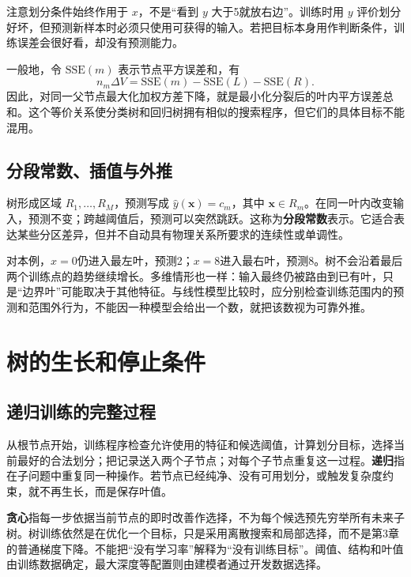 注意划分条件始终作用于 $x$，不是“看到 $y$ 大于5就放右边”。训练时用 $y$ 评价划分好坏，但预测新样本时必须只使用可获得的输入。若把目标本身用作判断条件，训练误差会很好看，却没有预测能力。

一般地，令 $\mathrm{SSE}(m)$ 表示节点平方误差和，有
\[
n_m\Delta V=\mathrm{SSE}(m)-\mathrm{SSE}(L)-\mathrm{SSE}(R).
\]
因此，对同一父节点最大化加权方差下降，就是最小化分裂后的叶内平方误差总和。这个等价关系使分类树和回归树拥有相似的搜索程序，但它们的具体目标不能混用。

\subsection{分段常数、插值与外推}
树形成区域 $R_1,\ldots,R_M$，预测写成 $\hat y(\mathbf x)=c_m$，其中 $\mathbf x\in R_m$。在同一叶内改变输入，预测不变；跨越阈值后，预测可以突然跳跃。这称为\textbf{分段常数}表示。它适合表达某些分区差异，但并不自动具有物理关系所要求的连续性或单调性。


对本例，$x=0$仍进入最左叶，预测2；$x=8$进入最右叶，预测8。树不会沿着最后两个训练点的趋势继续增长。多维情形也一样：输入最终仍被路由到已有叶，只是“边界叶”可能取决于其他特征。与线性模型比较时，应分别检查训练范围内的预测和范围外行为，不能因一种模型会给出一个数，就把该数视为可靠外推。

\section{树的生长和停止条件}
\subsection{递归训练的完整过程}
从根节点开始，训练程序检查允许使用的特征和候选阈值，计算划分目标，选择当前最好的合法划分；把记录送入两个子节点；对每个子节点重复这一过程。\textbf{递归}指在子问题中重复同一种操作。若节点已经纯净、没有可用划分，或触发复杂度约束，就不再生长，而是保存叶值。

\textbf{贪心}指每一步依据当前节点的即时改善作选择，不为每个候选预先穷举所有未来子树。树训练依然是在优化一个目标，只是采用离散搜索和局部选择，而不是第3章的普通梯度下降。不能把“没有学习率”解释为“没有训练目标”。阈值、结构和叶值由训练数据确定，最大深度等配置则由建模者通过开发数据选择。

